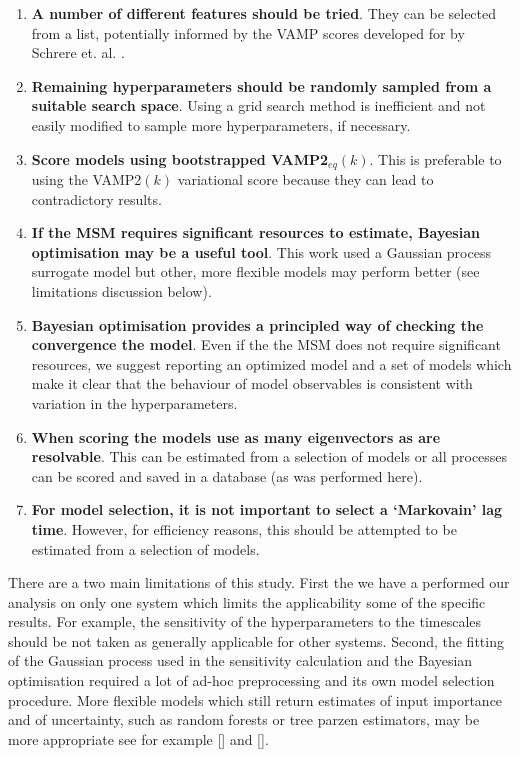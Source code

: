 \documentclass[journal=jacsat,manuscript=article]{achemso}
\begin{document}
\begin{enumerate}
    \item \textbf{A number of different features should be tried}. They can be selected from a list, potentially informed by the VAMP scores developed for by Schrere et. al. \cite{scherer_variational_2019}. 
    \item \textbf{Remaining hyperparameters should be randomly sampled from a suitable search space}. Using a grid search method is inefficient and not easily modified to sample more hyperparameters,  if necessary. 
    \item \textbf{Score models using bootstrapped VAMP2$_{eq}(k)$}. This is preferable to using the VAMP2$(k)$ variational score because they can lead to contradictory results. 
    \item \textbf{If the MSM requires significant resources to estimate, Bayesian optimisation may be a useful tool}.  This work used a Gaussian process surrogate model but other, more flexible models may perform better (see limitations discussion below). 
    \item \textbf{Bayesian optimisation provides a principled way of checking the convergence the model}.  Even if the the MSM does not require significant resources, we suggest reporting an optimized model and a set of models which make it clear that the behaviour of model observables is consistent with variation in the hyperparameters. 
    \item \textbf{When scoring the models use as many eigenvectors as are resolvable}. This can be estimated from a selection of models or all processes can be scored and saved in a database (as was performed here).  
    \item \textbf{For model selection, it is not important to select a `Markovain' lag time}. However, for efficiency reasons, this should be attempted to be estimated from a selection of models.  
\end{enumerate}

There are a two main limitations of this study.  First the we have a performed our analysis on only one system which limits the applicability some of the specific results. For example, the sensitivity of the hyperparameters to the timescales should be not taken as generally applicable for other systems. Second, the fitting of the Gaussian process used in the sensitivity calculation and the Bayesian optimisation required a lot of ad-hoc preprocessing and its own model selection procedure.  More flexible models which still return estimates of input importance and of uncertainty, such as random forests or tree parzen estimators, may be more appropriate see for example [] and [].   
\end{document}
